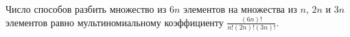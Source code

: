 \documentclass{article}
\begin{document}
Число способов разбить множество из $6n$ элементов на множества из $n$, $2n$ и $3n$ элементов равно мультиномиальному коэффициенту $\frac{(6n)!}{n! (2n)! (3n)!}$.
\end{document}
